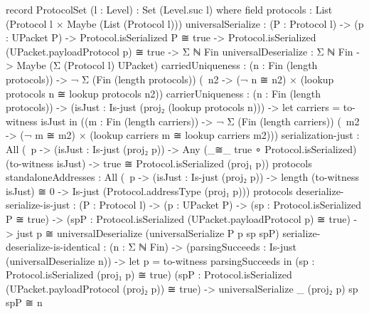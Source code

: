\documentclass{report}
\begin{document}
\begin{itemize}
\begin{code}
  record ProtocolSet (l : Level) : Set (Level.suc l) where
    field
      protocols : List (Protocol l × Maybe (List (Protocol l)))
      universalSerialize :
        (P : Protocol l) ->
        (p : UPacket P) ->
        Protocol.isSerialized P ≅ true ->
        Protocol.isSerialized (UPacket.payloadProtocol p) ≅ true ->
        Σ ℕ Fin
      universalDeserialize : Σ ℕ Fin -> Maybe (Σ (Protocol l) UPacket)
      carriedUniqueness :
        (n : Fin (length protocols)) ->
        ¬ Σ (Fin (length protocols))
            (\ n2 -> (¬ n ≅ n2) ×
                     (lookup protocols n ≅ lookup protocols n2))
      carrierUniqueness :
        (n : Fin (length protocols)) ->
        (isJust : Is-just (proj₂ (lookup protocols n))) ->
        let carriers = to-witness isJust in
        ((m : Fin (length carriers)) ->
         ¬ Σ (Fin (length carriers))
             (\ m2 -> (¬ m ≅ m2) ×
                      (lookup carriers m ≅ lookup carriers m2)))
      serialization-just :
        All (\ p -> (isJust : Is-just (proj₂ p))
                 -> Any (_≅_ true ∘ Protocol.isSerialized)
                        (to-witness isJust)
                 -> true ≅ Protocol.isSerialized (proj₁ p))
            protocols
      standaloneAddresses :
        All (\ p -> (isJust : Is-just (proj₂ p))
                 -> length (to-witness isJust) ≅ 0
                 -> Is-just (Protocol.addressType (proj₁ p)))
            protocols
      deserialize-serialize-is-just :
        (P : Protocol l) ->
        (p : UPacket P) ->
        (sp : Protocol.isSerialized P ≅ true) ->
        (spP : Protocol.isSerialized (UPacket.payloadProtocol p) ≅ true) ->
        just p ≅
        universalDeserialize (universalSerialize P p sp spP)
      serialize-deserialize-is-identical :
        (n : Σ ℕ Fin) ->
        (parsingSucceeds : Is-just (universalDeserialize n)) ->
        let p = to-witness parsingSucceeds in
        (sp : Protocol.isSerialized (proj₁ p) ≅ true)
        (spP : Protocol.isSerialized (UPacket.payloadProtocol (proj₂ p)) ≅ true) ->
        universalSerialize _ (proj₂ p) sp spP ≅ n
\end{code}


\end{itemize}
\end{document}
